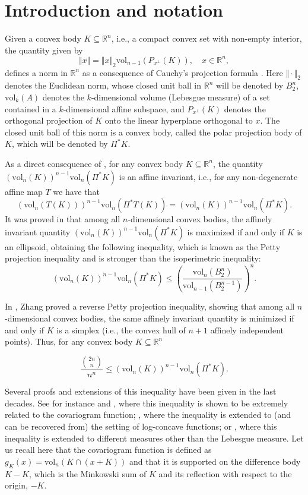 \documentclass[10pt]{amsart}
\def\R{\mathbb{R}}
\def\vol{\mathrm{vol}}
\numberwithin{equation}{section}
\begin{document}
\maketitle

\section{Introduction and notation}

Given a convex body $K\subseteq\R^n$, i.e., a compact convex set with non-empty interior, the quantity given by
$$
\Vert x\Vert=\Vert x\Vert_2\vol_{n-1}(P_{x^\perp}(K)),\quad x\in\R^n,
$$
defines a norm in $\R^n$ as a consequence of Cauchy's projection formula \cite[Equation (A.45)]{G}. Here $\Vert\cdot\Vert_2$ denotes the Euclidean norm, whose closed unit ball in $\R^n$ will be denoted by $B_2^n$, $\vol_k(A)$ denotes the $k$-dimensional volume (Lebesgue measure) of a set contained in a $k$-dimensional affine subspace, and $P_{x^\perp}(K)$ denotes the orthogonal projection of $K$ onto the linear hyperplane orthogonal to $x$.  The closed unit ball of this norm is a convex body, called the polar projection body of $K$, which will be denoted by $\Pi^*K$.

As a direct consequence of \cite[Theorem. 4.1.5]{G}, for any convex body $K\subseteq\R^n$, the quantity $(\vol_n(K))^{n-1}\vol_n(\Pi^*K)$ is an affine invariant, i.e., for any non-degenerate affine map $T$ we have that $$(\vol_n(T(K)))^{n-1}\vol_n(\Pi^*T(K))=(\vol_n(K))^{n-1}\vol_n(\Pi^*K).$$ It was proved in \cite{Pe} that among all $n$-dimensional convex bodies, the affinely invariant quantity $(\vol_n(K))^{n-1}\vol_n(\Pi^*K)$ is maximized if and only if $K$ is an ellipsoid, obtaining the following inequality, which is known as the Petty projection inequality and is stronger than the isoperimetric inequality:
$$
(\vol_n(K))^{n-1}\vol_n(\Pi^*K)\leq\left(\frac{\vol_n(B_2^n)}{\vol_{n-1}(B_2^{n-1})}\right)^n.
$$

In \cite{Zh}, Zhang proved a reverse Petty projection inequality, showing that among all $n$-dimensional convex bodies, the same affinely invariant quantity is minimized if and only if $K$ is a simplex (i.e., the convex hull of $n+1$ affinely independent points). Thus, for any convex body $K\subseteq\R^n$

\begin{equation}\label{eq:Zhang}
\frac{{{2n}\choose{n}}}{n^n}\leq(\vol_n(K))^{n-1}\vol_n(\Pi^*K).
\end{equation}

Several proofs and extensions of this inequality have been given in the last decades. See for instance \cite{AJV} and \cite{GZ}, where this inequality is shown to be extremely related to the covariogram function; \cite{ABG1}, where the inequality is extended to (and can be recovered from) the setting of log-concave functions; or \cite{LRZ}, where this inequality is extended to different measures other than the Lebesgue measure. Let us recall here that the covariogram function is defined as $g_K(x)=\vol_n(K\cap(x+K))$ and that it is supported on the difference body $K-K$, which is the Minkowski sum of $K$ and its reflection with respect to the origin, $-K$.
\end{document}
